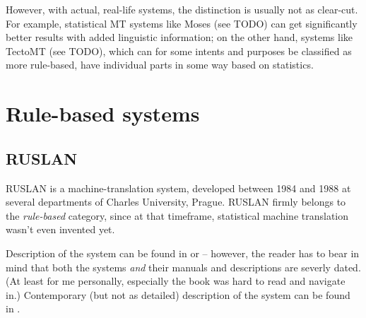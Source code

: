 However, with actual, real-life systems, the distinction is usually not as clear-cut. 
For example, statistical MT systems like Moses (see TODO) can get significantly better results with added linguistic information; 
on the other hand, systems like TectoMT (see TODO), which can for some intents and purposes be classified as more rule-based, have individual parts in some way based on statistics.

\section{Rule-based systems}




\subsection{RUSLAN}

RUSLAN is a machine-translation system, developed between 1984 and 1988 at several departments of Charles University, Prague. RUSLAN firmly belongs to the \emph{rule-based} category, since at that timeframe, statistical machine translation wasn't even invented yet.







Description of the system can be found in \cite{olivaruslan} or \cite{hajic1987} -- however, the reader has to bear in mind that both the systems \emph{and} their manuals and descriptions are severly dated. (At least for me personally, especially the book \cite{olivaruslan} was hard to read and navigate in.) Contemporary (but not as detailed) description of the system can be found in \cite{recycled}.

